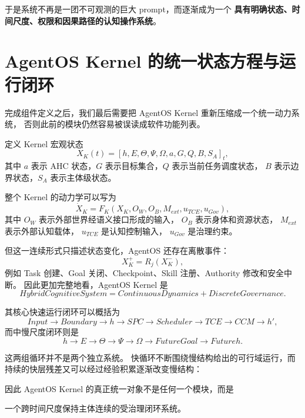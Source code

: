 于是系统不再是一团不可观测的巨大 prompt，而逐渐成为一个
\textbf{具有明确状态、时间尺度、权限和因果路径的认知操作系统}。


\section{AgentOS Kernel 的统一状态方程与运行闭环}

完成组件定义之后，我们最后需要把 AgentOS Kernel 重新压缩成一个统一动力系统，
否则此前的模块仍然容易被误读成软件功能列表。

定义 Kernel 宏观状态
\[
X_K(t)
=
\left[
h,
E,
\Theta,
\Psi,
\Omega,
a,
G,
Q,
B,
S_A
\right]_t,
\]
其中 $a$ 表示 AHC 状态，$G$ 表示目标集合，$Q$ 表示当前任务调度状态，
$B$ 表示边界状态，$S_A$ 表示主体级状态。

整个 Kernel 的动力学可以写为
\[
\dot X_K
=
F_K
\left(
X_K,
O_W,
O_B,
M_{ext},
u_{TCE},
u_{Gov}
\right),
\]
其中 $O_W$ 表示外部世界经语义接口形成的输入，
$O_B$ 表示身体和资源状态，
$M_{ext}$ 表示外部认知载体，
$u_{TCE}$ 是认知控制输入，
$u_{Gov}$ 是治理约束。

但这一连续形式只描述状态变化，AgentOS 还存在离散事件：
\[
X_K^+
=
R_j(X_K^-),
\]
例如 Task 创建、Goal 关闭、Checkpoint、Skill 注册、Authority 修改和安全中断。
因此更加完整地看，AgentOS Kernel 是
\[
\boxed{
HybridCognitiveSystem
=
ContinuousDynamics
+
DiscreteGovernance.
}
\]

其核心快速运行闭环可以概括为
\[
Input
\rightarrow
Boundary
\rightarrow
h
\rightarrow
SPC
\rightarrow
Scheduler
\rightarrow
TCE
\rightarrow
CCM
\rightarrow
h',
\]
而中慢尺度闭环则是
\[
h
\rightarrow
E
\rightarrow
\Theta
\rightarrow
\Psi
\rightarrow
\Omega
\rightarrow
FutureGoal
\rightarrow
Futureh.
\]

这两组循环并不是两个独立系统。
快循环不断围绕慢结构给出的可行域运行，而持续的快层残差又可以经过经验积累逐渐改变慢结构：
\begin{statementbox}
\centering
{}
\end{statementbox}
\begin{statementbox}
\centering
{}
\end{statementbox}

因此 AgentOS Kernel 的真正统一对象不是任何一个模块，而是
\begin{statementbox}
一个跨时间尺度保持主体连续的受治理闭环系统。
\end{statementbox}

